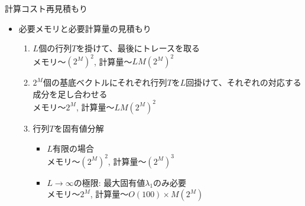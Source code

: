 \begin{frame}[t,fragile]{計算コスト再見積もり}
  \begin{itemize}
    \setlength{\itemsep}{1em}
  \item 必要メモリと必要計算量の見積もり
    \begin{enumerate}
    \item $L$個の行列$T$を掛けて、最後にトレースを取る \\
      メモリ〜$(2^M)^2$, 計算量〜$LM(2^M)^2$
    \item $2^M$個の基底ベクトルにそれぞれ行列$T$を$L$回掛けて、それぞれの対応する成分を足し合わせる \\
      メモリ〜$2^M$, 計算量〜$LM(2^M)^2$
    \item 行列$T$を固有値分解
      \begin{itemize}
        \item $L$有限の場合 \\
          メモリ〜$(2^M)^2$, 計算量〜$(2^M)^3$
        \item $L\rightarrow\infty$の極限: 最大固有値$\lambda_1$のみ必要 \\
          メモリ〜$2^M$, 計算量〜$O(100)\times M(2^M)$
      \end{itemize}
    \end{enumerate}
  \end{itemize}
\end{frame}
